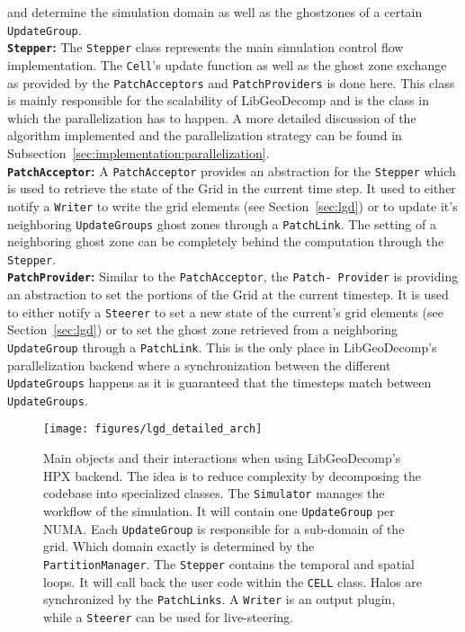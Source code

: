 \documentclass{sig-alternate}
\newcommand{\B}[1]{\textbf{#1}}
\newcommand{\ctype}[1]{\texttt{{{#1}}}}
\newcommand{\upp}{\vspace*{-0.5em}}
\begin{document}
and determine the simulation domain as well as the ghostzones of a certain
\ctype{UpdateGroup}. \\
\B{\ctype{Stepper}:} The \ctype{Stepper} class represents the main simulation
control flow implementation. The \ctype{Cell}'s update function as well as the
ghost zone exchange as provided by the \ctype{PatchAcceptors} and
\ctype{PatchProviders} is done here. This class is mainly responsible for the
scalability of LibGeoDecomp and is the class in which the parallelization has to
happen. A more detailed discussion of the algorithm implemented and the
parallelization strategy can be found in
Subsection~\ref{sec:implementation:parallelization}. \\
\B{\ctype{PatchAcceptor}:} A \ctype{PatchAcceptor} provides an abstraction for
the \ctype{Stepper} which is used to retrieve the state of the Grid in the
current time step. It used to either notify a \ctype{Writer} to write the grid
elements (see Section~\ref{sec:lgd}) or to update it's neighboring
\ctype{UpdateGroups} ghost zones through a \ctype{PatchLink}. The setting of a
neighboring ghost zone can be completely behind the computation through the
\ctype{Stepper}. \\
\B{\ctype{PatchProvider}:} Similar to the \ctype{PatchAcceptor}, the
\ctype{Patch- Provider} is providing an abstraction to set the portions of the Grid
at the current time\-step. It is used to either notify a \ctype{Steerer} to set a
new state of the current's grid elements (see Section~\ref{sec:lgd}) or to set
the ghost zone retrieved from a neighboring \ctype{UpdateGroup} through a
\ctype{PatchLink}. This is the only place in LibGeoDecomp's parallelization
backend where a synchronization between the different \ctype{UpdateGroups}
happens as it is guaranteed that the time\-steps match between \ctype{UpdateGroups}.

\begin{figure}
  \texttt{[image: figures/lgd\_detailed\_arch]}
    \upp
  \caption{
    Main objects and their interactions when using LibGeoDecomp's HPX
    backend. The idea is to reduce complexity by decomposing the
    codebase into specialized classes. The \ctype{Simulator} manages
    the workflow of the simulation. It will contain one
    \ctype{UpdateGroup} per NUMA. Each \ctype{UpdateGroup} is
    responsible for a sub-domain of the grid. Which domain exactly is
    determined by the \ctype{PartitionManager}. The \ctype{Stepper}
    contains the temporal and spatial loops. It will call back the
    user code within the \ctype{CELL} class. Halos are synchronized by
    the \ctype{PatchLinks}. A \ctype{Writer} is an output plugin,
    while a \ctype{Steerer} can be used for live-steering. }
\upp\upp\upp\upp
\label{fig:lgdhpxarch}
\end{figure}
\end{document}
